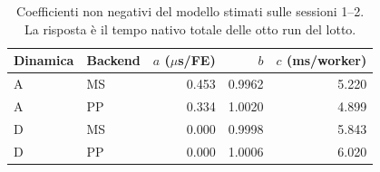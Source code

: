 \begin{table}[H]\centering\small
\caption{Coefficienti non negativi del modello stimati sulle sessioni 1--2. La risposta è il tempo nativo totale delle otto run del lotto.}\label{tab:model}
\begin{tabular}{@{}llrrr@{}}
\toprule Dinamica & Backend & $a$ ($\mu$s/FE) & $b$ & $c$ (ms/worker)\\\midrule
A & MS & 0.453 & 0.9962 & 5.220\\
A & PP & 0.334 & 1.0020 & 4.899\\
D & MS & 0.000 & 0.9998 & 5.843\\
D & PP & 0.000 & 1.0006 & 6.020\\
\bottomrule\end{tabular}
\end{table}
